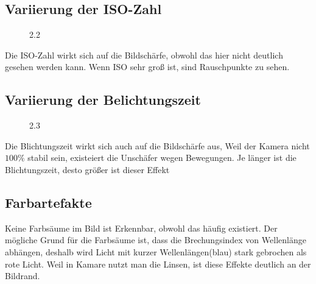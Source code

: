 \documentclass[12pt]{article}
\begin{document}
\subsection{Variierung der ISO-Zahl}
\begin{figure}[ht]\centering
	\caption{2.2}
\end{figure}
Die ISO-Zahl wirkt sich auf die Bildschärfe, obwohl das hier nicht deutlich gesehen werden kann. Wenn ISO sehr groß ist, sind Rauschpunkte zu sehen. 
\newpage
\subsection{Variierung der Belichtungszeit}
\begin{figure}[ht]\centering
	\caption{2.3}
\end{figure}
Die Blichtungszeit wirkt sich auch auf die Bildschärfe aus, Weil der Kamera nicht $100 \%$ stabil sein, existeiert die Unschäfer wegen Bewegungen. Je länger ist die Blichtungszeit, desto größer ist dieser Effekt \newline
\subsection{Farbartefakte}
Keine Farbsäume im Bild ist Erkennbar, obwohl das häufig existiert. Der mögliche Grund für die Farbsäume ist, dass die Brechungsindex von Wellenlänge abhängen, deshalb wird Licht mit kurzer Wellenlängen(blau) stark gebrochen als rote Licht. Weil in Kamare nutzt man die Linsen, ist diese Effekte deutlich an der Bildrand.
\end{document}
